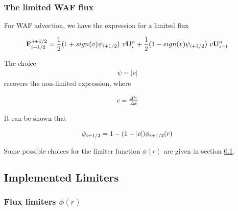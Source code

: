 \subsubsection{The limited WAF flux}\label{chap:WAF-limiters}



For WAF advection, we have the expression for a limited flux

\begin{equation}
	\mathbf{F}_{i+1/2}^{n+1/2} =  
		\frac{1}{2} (1 + sign(v) \psi_{i+1/2})\ v \mathbf{U}_i^n + \frac{1}{2} (1 - sign(v) \psi_{i+1/2})\ v \mathbf{U}_{i+1}^n
\end{equation}


The choice
\begin{align*}
	\psi = |c|
\end{align*}
recovers the non-limited expression, where

\begin{align*}
	c = \frac{\Delta t v}{\Delta x}
\end{align*}


It can be shown that

\begin{equation}
	\psi_{i+1/2} = 1 - ( 1 - |c|) \phi_{i+1/2}(r)
\end{equation}


Some possible choices for the limiter function $\phi(r)$ are given in section \ref{chap:implemented_limiters}.













\subsection{ Implemented Limiters} \label{chap:implemented_limiters}






\subsubsection{Flux limiters $\phi(r)$}

